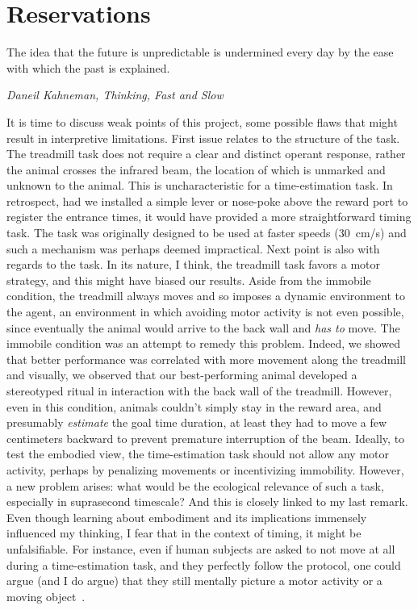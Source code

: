 \section{Reservations}
{\singlespacing \epigraph{The idea that the future is unpredictable is undermined every day by the ease with which the past is explained.}
{\textit{Daneil Kahneman, Thinking, Fast and Slow}}}
\noindent
It is time to discuss weak points of this project, some possible flaws that might result in interpretive limitations.
First issue relates to the structure of the task.
The treadmill task does not require a clear and distinct operant response, rather the animal crosses the infrared beam, the location of which is unmarked and unknown to the animal.
This is uncharacteristic for a time-estimation task.
In retrospect, had we installed a simple lever or nose-poke above the reward port to register the entrance times, it would have provided a more straightforward timing task.
The task was originally designed to be used at faster speeds (30~cm/s) and such a mechanism was perhaps deemed impractical.
Next point is also with regards to the task.
In its nature, I think, the treadmill task favors a motor strategy, and this might have biased our results.
Aside from the immobile condition, the treadmill always moves and so imposes a dynamic environment to the agent, an environment in which avoiding motor activity is not even possible, since eventually the animal would arrive to the back wall and \textit{has to} move.
The immobile condition was an attempt to remedy this problem.
Indeed, we showed that better performance was correlated with more movement along the treadmill and visually, we observed that our best-performing animal developed a stereotyped ritual in interaction with the back wall of the treadmill.
However, even in this condition, animals couldn't simply stay in the reward area, and presumably \textit{estimate} the goal time duration, at least they had to move a few centimeters backward to prevent premature interruption of the beam.
Ideally, to test the embodied view, the time-estimation task should not allow any motor activity, perhaps by penalizing movements or incentivizing immobility.
However, a new problem arises:
    what would be the ecological relevance of such a task, especially in suprasecond timescale?
And this is closely linked to my last remark.
Even though learning about embodiment and its implications immensely influenced my thinking, I fear that in the context of timing, it might be unfalsifiable.
For instance, even if human subjects are asked to not move at all during a time-estimation task, and they perfectly follow the protocol, one could argue (and I do argue) that they still mentally picture a motor activity or a moving object~\cite[also][]{Coull2018}.
